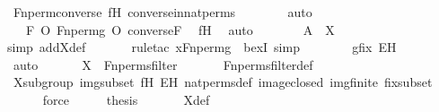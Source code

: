 \begin{isabellebody}
\ Fn{\isacharunderscore}{\kern0pt}perm{\isacharprime}{\kern0pt}{\isacharunderscore}{\kern0pt}converse\ fH\ converse{\isacharunderscore}{\kern0pt}in{\isacharunderscore}{\kern0pt}nat{\isacharunderscore}{\kern0pt}perms\isanewline
\ \ \ \ \ \ \isamarkupfalse%
\ auto\isanewline
\ \ \ \ \isamarkupfalse%
\ \isamarkupfalse%
\ {\isachardoublequoteopen}{\isachardot}{\kern0pt}{\isachardot}{\kern0pt}{\isachardot}{\kern0pt}\ {\isacharequal}{\kern0pt}\ F\ O\ Fn{\isacharunderscore}{\kern0pt}perm{\isacharprime}{\kern0pt}{\isacharparenleft}{\kern0pt}g{\isacharparenright}{\kern0pt}\ O\ converse{\isacharparenleft}{\kern0pt}F{\isacharparenright}{\kern0pt}{\isachardoublequoteclose}\ \isamarkupfalse%
\ fH\ \isamarkupfalse%
\ auto\isanewline
\ \ \ \ \isamarkupfalse%
\ \isamarkupfalse%
\ {\isachardoublequoteopen}A\ {\isasymin}\ X{\isachardoublequoteclose}\ \isanewline
\ \ \ \ \ \ \isamarkupfalse%
{\isacharparenleft}{\kern0pt}simp\ add{\isacharcolon}{\kern0pt}X{\isacharunderscore}{\kern0pt}def{\isacharparenright}{\kern0pt}\isanewline
\ \ \ \ \ \ \isamarkupfalse%
{\isacharparenleft}{\kern0pt}rule{\isacharunderscore}{\kern0pt}tac\ x{\isacharequal}{\kern0pt}{\isachardoublequoteopen}Fn{\isacharunderscore}{\kern0pt}perm{\isacharprime}{\kern0pt}{\isacharparenleft}{\kern0pt}g{\isacharparenright}{\kern0pt}{\isachardoublequoteclose}\ \ bexI{\isacharcomma}{\kern0pt}\ simp{\isacharparenright}{\kern0pt}\isanewline
\ \ \ \ \ \ \isamarkupfalse%
\ gfix\ EH\ \isanewline
\ \ \ \ \ \ \isamarkupfalse%
\ auto\isanewline
\ \ \isamarkupfalse%
\isanewline
\isanewline
\ \ \isamarkupfalse%
\ {\isachardoublequoteopen}X\ {\isasymin}\ Fn{\isacharunderscore}{\kern0pt}perms{\isacharunderscore}{\kern0pt}filter{\isachardoublequoteclose}\ \isanewline
\ \ \ \ \isamarkupfalse%
\ Fn{\isacharunderscore}{\kern0pt}perms{\isacharunderscore}{\kern0pt}filter{\isacharunderscore}{\kern0pt}def\ \isanewline
\ \ \ \ \isamarkupfalse%
\ Xsubgroup\ imgsubset\ fH\ EH\ nat{\isacharunderscore}{\kern0pt}perms{\isacharunderscore}{\kern0pt}def\ image{\isacharunderscore}{\kern0pt}closed\ imgfinite\ fixsubset\isanewline
\ \ \ \ \isamarkupfalse%
\ force\isanewline
\isanewline
\ \ \isamarkupfalse%
\ \isamarkupfalse%
\ {\isacharquery}{\kern0pt}thesis\ \isanewline
\ \ \ \ \isamarkupfalse%
\ X{\isacharunderscore}{\kern0pt}def\ \isanewline

\end{isabellebody}
